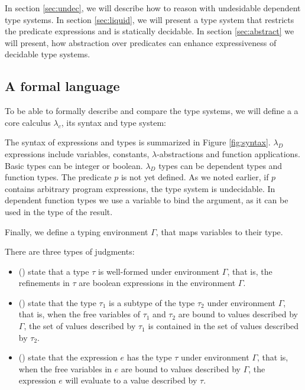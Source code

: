 In section \ref{sec:undec},
we will describe how to reason with undesidable dependent type systems.
In section \ref{sec:liquid}, 
we will present a type system that restricts 
the predicate expressions and is statically decidable.
In section \ref{sec:abstract} 
we will present, how abstraction over predicates
can enhance expressiveness of decidable type systems. 

\subsection{A formal language}\label{subsec:formal}

To be able to formally describe and compare the type systems, 
we will define a a core calculus $\lambda_c$, its syntax and type system:

The syntax of expressions and types is summarized in Figure \ref{fig:syntax}.
$\lambda_D$ expressions include variables, constants, $\lambda$-abstractions
and function applications. 
Basic types can be integer or boolean.
$\lambda_D$ types can be dependent types and function types.
The predicate $p$ is
not yet defined. As we noted earlier, if $p$ contains arbitrary program 
expressions, the type system is undecidable.
In dependent function types we use a variable to bind the argument, 
as it can be used in the type of the result.

Finally, we define a typing environment $\Gamma$, that maps variables to their type.


There are three types of judgments:
\begin{itemize}
\item{ (\isWellFormed{\Gamma}{\tau})} 
state that a type $\tau$ is well-formed under environment
$\Gamma$, that is, the refinements in $\tau$ are boolean 
expressions in the environment $\Gamma$.

\item{ ()} 
state that the type $\tau_1$ is a subtype of the type
$\tau_2$ under environment $\Gamma$, that is, when the free variables
of $\tau_1$ and $\tau_2$
are bound to values described by $\Gamma$, the set of values described
by $\tau_1$ is contained in the set of values described by $\tau_2$. 


\item{ ()} state that
the expression $e$ has the type $\tau$ under environment $\Gamma$,
that is, when the free variables in $e$ are bound to values described by 
$\Gamma$, the expression $e$ will evaluate to a value described by $\tau$.
\end{itemize}

